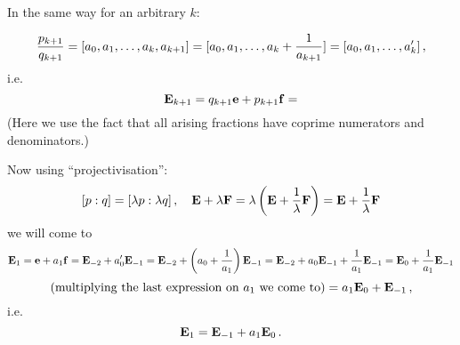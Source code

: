In the same way for an arbitrary $k$:



 $$
{p_{k+1}\over q_{k+1}}=
[a_0,a_1,\dots,a_k,a_{k+1}]=
[a_0,a_1,\dots,a_k+{1\over a_{k+1}}]=
[a_0,a_1,\dots,a'_k]\,,
  $$ 
i.e.
       $$
{\bf E}_{k+1}=q_{k+1}{\bf e}+p_{k+1}{\bf f}=
       $$
(Here we use the fact that all arising fractions
have coprime numerators and denominators.)

Now using ``projectivisation'':
          $$   
[p:q]=[\lambda p:\lambda q]\,,
\quad
{\bf E}+\lambda {\bf F}=
\lambda\left(
{\bf E}+{1\over \lambda} {\bf F}
\right)
 =
{\bf E}+{1\over \lambda} {\bf F}
     $$ 
we will come to 
        $$
{\bf E}_1={\bf e}+a_1{\bf f}={\bf E}_{-2}+a'_0{\bf E}_{-1}=
               {\bf E}_{-2}+
    \left(a_0+{1\over a_1}\right){\bf E}_{-1}=
       {\bf E}_{-2}+a_0{\bf E}_{-1}+{1\over a_1}{\bf E}_{-1}=
        {\bf E}_0+{1\over a_1}{\bf E}_{-1}
         $$
       $$
 (\hbox {multiplying the last expression on
$a_1$ we come to}) =
 a_1{\bf E}_0+{\bf E}_{-1}\,, 
           $$
  i.e.
          $$
{\bf E}_1={\bf E}_{-1}+a_1{\bf E}_{0}\,.
          $$

\bye
